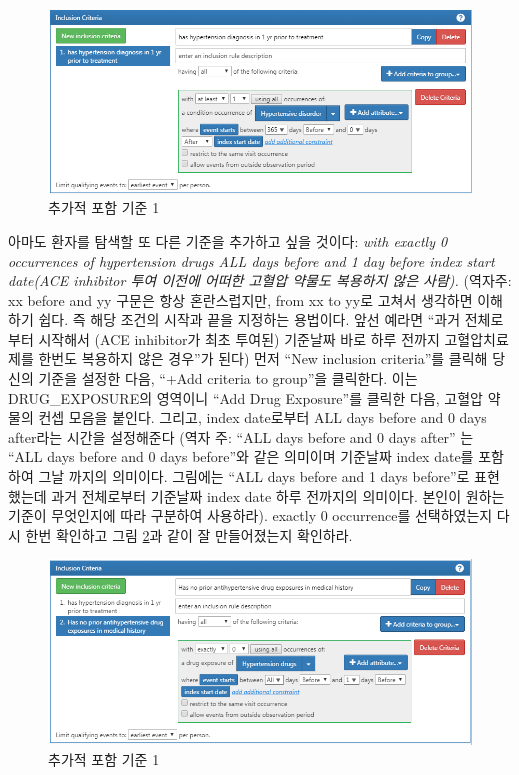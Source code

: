 \documentclass[11pt]{book}
\theoremstyle{definition}
\theoremstyle{definition}
\theoremstyle{definition}
\theoremstyle{remark}
\begin{document}
\begin{figure}

{\centering \includegraphics[width=1\linewidth]{images/Cohorts/ATLAS-IC1} 

}

\caption{추가적 포함 기준 1}\label{fig:ATLASIC1}
\end{figure}

아마도 환자를 탐색할 또 다른 기준을 추가하고 싶을 것이다: \emph{with
exactly 0 occurrences of hypertension drugs ALL days before and 1 day
before index start date(ACE inhibitor 투여 이전에 어떠한 고혈압 약물도
복용하지 않은 사람).} (역자주: xx before and yy 구문은 항상
혼란스럽지만, from xx to yy로 고쳐서 생각하면 이해하기 쉽다. 즉 해당
조건의 시작과 끝을 지정하는 용법이다. 앞선 예라면 ``과거 전체로부터
시작해서 (ACE inhibitor가 최초 투여된) 기준날짜 바로 하루 전까지
고혈압치료제를 한번도 복용하지 않은 경우''가 된다) 먼저 ``New inclusion
criteria''를 클릭해 당신의 기준을 설정한 다음, ``+Add criteria to
group''을 클릭한다. 이는 DRUG\_EXPOSURE의 영역이니 ``Add Drug
Exposure''를 클릭한 다음, 고혈압 약물의 컨셉 모음을 붙인다. 그리고,
index date로부터 ALL days before and 0 days after라는 시간을 설정해준다
(역자 주: ``ALL days before and 0 days after'' 는 ``ALL days before and
0 days before''와 같은 의미이며 기준날짜 index date를 포함하여 그날
까지의 의미이다. 그림에는 ``ALL days before and 1 days before''로
표현했는데 과거 전체로부터 기준날짜 index date 하루 전까지의 의미이다.
본인이 원하는 기준이 무엇인지에 따라 구분하여 사용하라). exactly 0
occurrence를 선택하였는지 다시 한번 확인하고 그림 \ref{fig:ATLASIC2}과
같이 잘 만들어졌는지 확인하라.

\begin{figure}

{\centering \includegraphics[width=1\linewidth]{images/Cohorts/ATLAS-IC2} 

}

\caption{추가적 포함 기준 1}\label{fig:ATLASIC2}
\end{figure}
\end{document}
